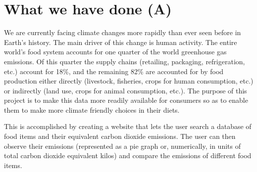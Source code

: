 \section{What we have done (A)}
We are currently facing climate changes more rapidly than ever seen before in Earth’s history. The main driver of this change is human activity. The entire world’s food system accounts for one quarter of the world greenhouse gas emissions. Of this quarter the supply chains (retailing, packaging, refrigeration, etc.) account for 18\%, and the remaining 82\% are accounted for by food production either directly (livestock, fisheries, crops for human consumption, etc.) or indirectly (land use, crops for animal consumption, etc.)\cite{FoodStat}. The purpose of this project is to make this data more readily available for consumers so as to enable them to make more climate friendly choices in their diets. 

This is accomplished by creating a website that lets the user search a database of food items and their equivalent carbon dioxide emissions. The user can then observe their emissions (represented as a pie graph or, numerically, in units of total carbon dioxide equivalent kilos) and compare the emissions of different food items. 
